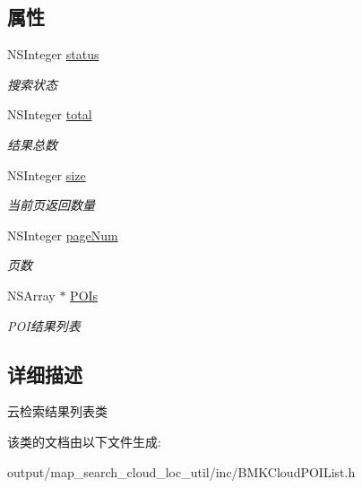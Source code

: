 \subsection*{属性}
\begin{DoxyCompactItemize}
\item 
\hypertarget{interface_b_m_k_cloud_p_o_i_list_a9a0761aa32216b6d96a3f3d538d8f2db}{N\+S\+Integer \hyperlink{interface_b_m_k_cloud_p_o_i_list_a9a0761aa32216b6d96a3f3d538d8f2db}{status}}\label{interface_b_m_k_cloud_p_o_i_list_a9a0761aa32216b6d96a3f3d538d8f2db}

\begin{DoxyCompactList}\small\item\em 搜索状态 \end{DoxyCompactList}\item 
\hypertarget{interface_b_m_k_cloud_p_o_i_list_a71aa046e96ad04026feb159383d3f615}{N\+S\+Integer \hyperlink{interface_b_m_k_cloud_p_o_i_list_a71aa046e96ad04026feb159383d3f615}{total}}\label{interface_b_m_k_cloud_p_o_i_list_a71aa046e96ad04026feb159383d3f615}

\begin{DoxyCompactList}\small\item\em 结果总数 \end{DoxyCompactList}\item 
\hypertarget{interface_b_m_k_cloud_p_o_i_list_a2d38d103dd34862c538ed99a635aafb5}{N\+S\+Integer \hyperlink{interface_b_m_k_cloud_p_o_i_list_a2d38d103dd34862c538ed99a635aafb5}{size}}\label{interface_b_m_k_cloud_p_o_i_list_a2d38d103dd34862c538ed99a635aafb5}

\begin{DoxyCompactList}\small\item\em 当前页返回数量 \end{DoxyCompactList}\item 
\hypertarget{interface_b_m_k_cloud_p_o_i_list_a1301275f0561c350c223dcf838502df8}{N\+S\+Integer \hyperlink{interface_b_m_k_cloud_p_o_i_list_a1301275f0561c350c223dcf838502df8}{page\+Num}}\label{interface_b_m_k_cloud_p_o_i_list_a1301275f0561c350c223dcf838502df8}

\begin{DoxyCompactList}\small\item\em 页数 \end{DoxyCompactList}\item 
\hypertarget{interface_b_m_k_cloud_p_o_i_list_a682ea5efc9695565e9ceacc9553d436d}{N\+S\+Array $\ast$ \hyperlink{interface_b_m_k_cloud_p_o_i_list_a682ea5efc9695565e9ceacc9553d436d}{P\+O\+Is}}\label{interface_b_m_k_cloud_p_o_i_list_a682ea5efc9695565e9ceacc9553d436d}

\begin{DoxyCompactList}\small\item\em P\+O\+I结果列表 \end{DoxyCompactList}\end{DoxyCompactItemize}


\subsection{详细描述}
云检索结果列表类 

该类的文档由以下文件生成\+:\begin{DoxyCompactItemize}
\item 
output/map\+\_\+search\+\_\+cloud\+\_\+loc\+\_\+util/inc/B\+M\+K\+Cloud\+P\+O\+I\+List.\+h\end{DoxyCompactItemize}
